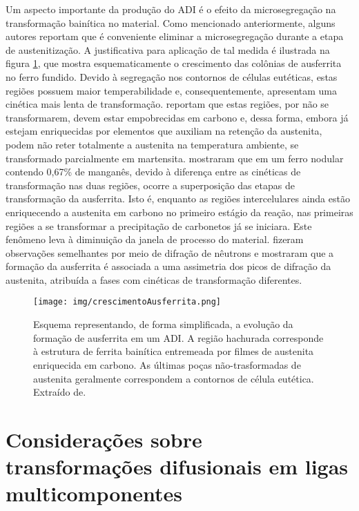 Um aspecto importante da produção do ADI é o efeito da microsegregação na transformação bainítica no material. Como mencionado anteriormente, alguns autores reportam que é conveniente eliminar a microsegregação durante a etapa de austenitização. A justificativa para aplicação de tal medida é ilustrada na figura \ref{fig:cineticaADI}, que mostra esquematicamente o crescimento das colônias de ausferrita no ferro fundido. Devido à segregação nos contornos de células eutéticas, estas regiões possuem maior temperabilidade e, consequentemente, apresentam uma cinética mais lenta de transformação.  reportam que estas regiões, por não se transformarem, devem estar empobrecidas em carbono e, dessa forma, embora já estejam enriquecidas por elementos que auxiliam na retenção da austenita, podem não reter totalmente a austenita na temperatura ambiente, se transformado parcialmente em martensita.  mostraram que em um ferro nodular contendo 0,67\% de manganês, devido à diferença entre as cinéticas de transformação nas duas regiões, ocorre a superposição das etapas de transformação da ausferrita. Isto é, enquanto as regiões intercelulares ainda estão enriquecendo a austenita em carbono no primeiro estágio da reação, nas primeiras regiões a se transformar a precipitação de carbonetos já se iniciara. Este fenômeno leva à diminuição da janela de processo do material.  fizeram observações semelhantes por meio de difração de nêutrons  e mostraram que a formação da ausferrita é associada a uma assimetria dos picos de difração da austenita, atribuída a fases com cinéticas de transformação diferentes.

\begin{figure}
	\texttt{[image: img/crescimentoAusferrita.png]}
	\caption{Esquema representando, de forma simplificada, a evolução da formação de ausferrita em um ADI. A região hachurada corresponde à estrutura de ferrita bainítica entremeada por filmes de austenita enriquecida em carbono. As últimas poças não-trasformadas de austenita geralmente correspondem a contornos de célula eutética. Extraído de\cite{Aranzabal1997}.}
	\label{fig:cineticaADI}
\end{figure}


\section{Considera\c{c}\~{o}es sobre transforma\c{c}\~{o}es difusionais em ligas multicomponentes}

